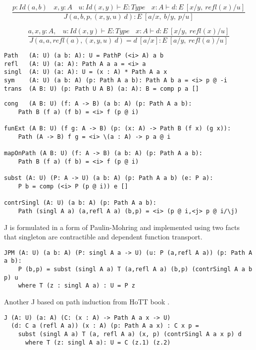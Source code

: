 \documentclass{aip-cp}
\begin{document}
\begin{equation}
\tag{$J$-elimination}
\dfrac
  {p:Id(a,b)\ \ \ \ x,y:A\ \ \ \ u:Id(x,y) \vdash E:Type\ \ \ \ x:A \vdash d: E\ [x/y,\ refl(x)/u]}
  {J(a,b,p,(x,y,u)\ d) : E\ [a/x,\ b/y,\ p/u]}
\end{equation}

\begin{equation}
\tag{$Id$-computation}
\dfrac
  {a,x,y:A,\ \ \ \ u:Id(x,y) \vdash E:Type\ \ \ \ x:A \vdash d:E\ [x/y,\ refl(x)/u]}
  {J(a,a,refl(a),(x,y,u)\ d) = d\ [a/x] : E\ [a/y,\ refl(a)/u]}
\end{equation}

\begin{lstlisting}[mathescape=true]
Path   (A: U) (a b: A): U = PathP (<i> A) a b
refl   (A: U) (a: A): Path A a a = <i> a
singl  (A: U) (a: A): U = (x : A) * Path A a x
sym    (A: U) (a b: A) (p: Path A a b): Path A b a = <i> p @ -i
trans  (A B: U) (p: Path U A B) (a: A): B = comp p a []
\end{lstlisting}

\begin{lstlisting}[mathescape=true]
cong   (A B: U) (f: A -> B) (a b: A) (p: Path A a b):
    Path B (f a) (f b) = <i> f (p @ i)

funExt (A B: U) (f g: A -> B) (p: (x: A) -> Path B (f x) (g x)):
    Path (A -> B) f g = <i> \(a : A) -> p a @ i

mapOnPath (A B: U) (f: A -> B) (a b: A) (p: Path A a b):
    Path B (f a) (f b) = <i> f (p @ i)

subst (A: U) (P: A -> U) (a b: A) (p: Path A a b) (e: P a):
    P b = comp (<i> P (p @ i)) e []

contrSingl (A: U) (a b: A) (p: Path A a b):
    Path (singl A a) (a,refl A a) (b,p) = <i> (p @ i,<j> p @ i/\j)
\end{lstlisting}

J is formulated in a form of Paulin-Mohring and implemented
using two facts that singleton are contractible and dependent function transport.

\begin{lstlisting}[mathescape=true]
JPM (A: U) (a b: A) (P: singl A a -> U) (u: P (a,refl A a)) (p: Path A a b):
    P (b,p) = subst (singl A a) T (a,refl A a) (b,p) (contrSingl A a b p) u
    where T (z : singl A a) : U = P z
\end{lstlisting}

Another J based on path induction from HoTT book \cite{HoTT13}.

\begin{lstlisting}[mathescape=true]
J (A: U) (a: A) (C: (x : A) -> Path A a x -> U)
  (d: C a (refl A a)) (x : A) (p: Path A a x) : C x p =
    subst (singl A a) T (a, refl A a) (x, p) (contrSingl A a x p) d
      where T (z: singl A a): U = C (z.1) (z.2)
\end{lstlisting}
\end{document}
